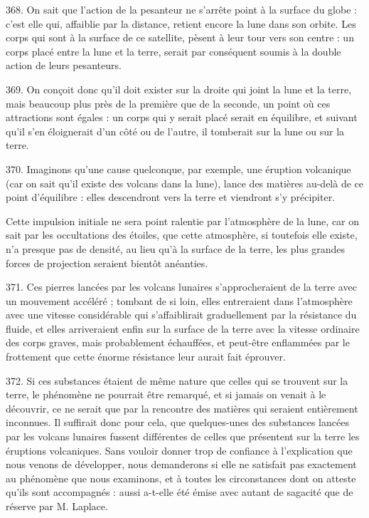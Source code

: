 \documentclass[a4paper, 11pt, oneside, polutonikogreek, french]{article}
\begin{document}
368. On sait que l'action de la pesanteur ne s'arrête point à la surface du globe : c'est elle qui, affaiblie par la distance, retient encore la lune dans son orbite. Les corps qui sont à la surface de ce satellite, pèsent à leur tour vers son centre : un corps placé entre la lune et la terre, serait par conséquent soumis à la double action de leurs pesanteurs.

369. On conçoit donc qu'il doit exister sur la droite qui joint la lune et la terre, mais beaucoup plus près de la première que de la seconde, un point où ces attractions sont égales : un corps qui y serait placé serait en équilibre, et suivant qu'il s'en éloignerait d'un côté ou de l'autre, il tomberait sur la lune ou sur la terre.

370. Imaginons qu'une cause quelconque, par exemple, une éruption volcanique (car on sait qu'il existe des volcans dans la lune), lance des matières au-delà de ce point d'équilibre : elles descendront vers la terre et viendront s'y précipiter.

Cette impulsion initiale ne sera point ralentie par l'atmosphère de la lune, car on sait par les occultations des étoiles, que cette atmosphère, si toutefois elle existe, n'a presque pas de densité, au lieu qu'à la surface de la terre, les plus grandes forces de projection seraient bientôt anéanties.

371. Ces pierres lancées par les volcans lunaires s'approcheraient de la terre avec un mouvement accéléré ; tombant de si loin, elles entreraient dans l'atmosphère avec une vitesse considérable qui s'affaiblirait graduellement par la résistance du fluide, et elles arriveraient enfin sur la surface de la terre avec la vitesse ordinaire des corps graves, mais probablement échauffées, et peut-être enflammées par le frottement que cette énorme résistance leur aurait fait éprouver.

372. Si ces substances étaient de même nature que celles qui se trouvent sur la terre, le phénomène ne pourrait être remarqué, et si jamais on venait à le découvrir, ce ne serait que par la rencontre des matières qui seraient entièrement inconnues. Il suffirait donc pour cela, que quelques-unes des substances lancées par les volcans lunaires fussent différentes de celles que présentent sur la terre les éruptions volcaniques. Sans vouloir donner trop de confiance à l'explication que nous venons de développer, nous demanderons si elle ne satisfait pas exactement au phénomène que nous examinons, et à toutes les circonstances dont on atteste qu'ils sont accompagnés : aussi a-t-elle été émise avec autant de sagacité que de réserve par M. Laplace.
\end{document}
